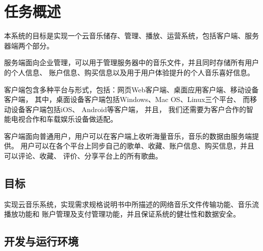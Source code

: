 \chapter{任务概述}
本系统的目标是实现一个云音乐储存、管理、播放、运营系统，包括客户端、服务器端两个部分。

服务端面向企业管理，可以用于管理服务器中的音乐文件，并且同时存储所有用户的个人信息、
账户信息、购买信息以及用于用户体验提升的个人音乐喜好信息。

客户端包含多种平台与形式，包括：网页Web客户端、桌面应用客户端、移动设备客户端，
其中，桌面设备客户端包括Windows、Mac OS、Linux三个平台、 而移动设备客户端包括iOS、
Android等客户端， 并且， 我们还需要为客户合作的智能电视合作和车载娱乐设备做适配。

客户端面向普通用户，用户可以在客户端上收听海量音乐，音乐的数据由服务端提供。
用户可以在各个平台上同步自己的歌单、收藏、账户信息、购买信息，并且可以评论、收藏、
评价、分享平台上的所有歌曲。

\section{目标}
实现云音乐系统，实现需求规格说明书中所描述的网络音乐文件传输功能、音乐流播放功能和
账户管理及支付管理功能，并且保证系统的健壮性和数据安全。

\newpage
\section{开发与运行环境}


